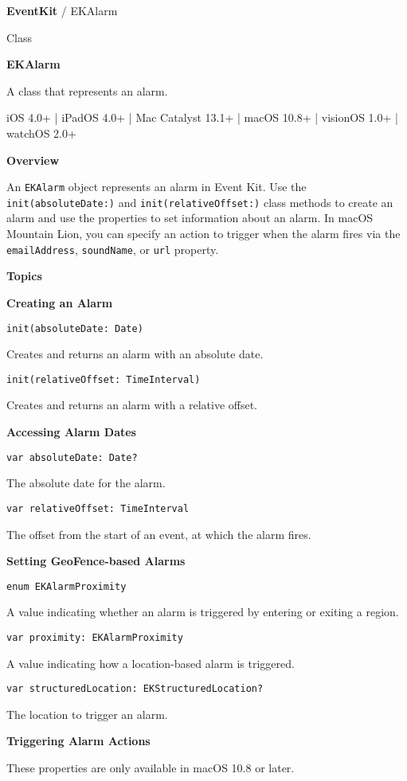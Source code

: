 \documentclass{article}
\title{}
\author{}
\date{}
\begin{document}
\textbf{EventKit} / EKAlarm

Class

\textbf{EKAlarm}

A class that represents an alarm.

iOS 4.0+ | iPadOS 4.0+ | Mac Catalyst 13.1+ | macOS 10.8+ | visionOS 1.0+ | watchOS 2.0+

\noindent{}

\textbf{Overview}

An \texttt{EKAlarm} object represents an alarm in Event Kit. Use the \texttt{init(absoluteDate:)} and \texttt{init(relativeOffset:)} class methods to create an alarm and use the properties to set information about an alarm. In macOS Mountain Lion, you can specify an action to trigger when the alarm fires via the \texttt{emailAddress}, \texttt{soundName}, or \texttt{url} property.

\textbf{Topics}

\textbf{Creating an Alarm}

\texttt{init(absoluteDate: Date)}

Creates and returns an alarm with an absolute date.

\texttt{init(relativeOffset: TimeInterval)}

Creates and returns an alarm with a relative offset.

\textbf{Accessing Alarm Dates}

\texttt{var absoluteDate: Date?}

The absolute date for the alarm.

\texttt{var relativeOffset: TimeInterval}

The offset from the start of an event, at which the alarm fires.

\textbf{Setting GeoFence-based Alarms}

\texttt{enum EKAlarmProximity}

A value indicating whether an alarm is triggered by entering or exiting a region.

\texttt{var proximity: EKAlarmProximity}

A value indicating how a location-based alarm is triggered.

\texttt{var structuredLocation: EKStructuredLocation?}

The location to trigger an alarm.

\textbf{Triggering Alarm Actions}

These properties are only available in macOS 10.8 or later.
\end{document}
